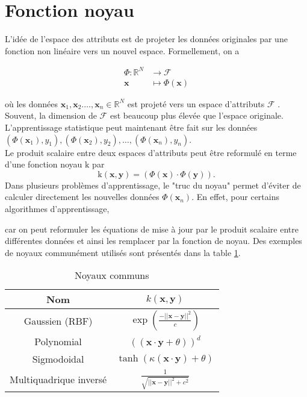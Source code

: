 \section{Fonction noyau}

L'idée de l'espace des attributs est de projeter les données originales par une fonction non linéaire vers un nouvel espace. Formellement, on a 

\begin{align*}
\Phi : \mathbb{R}^N &\to \mathcal{F} \\
\textbf{x} &\mapsto \Phi(\textbf{x})
\end{align*}

où les données $\textbf{x}_1, \textbf{x}_2. \dots, \textbf{x}_n \in \mathbb{R}^N$ est projeté vers un espace d'attributs $\mathcal{F}$ \cite{muller2001introduction}. Souvent, la dimension de $\mathcal{F}$ est beaucoup plus élevée que l'espace originale. L'apprentissage statistique peut maintenant être fait sur les données $(\Phi(\textbf{x}_1), y_1), (\Phi(\textbf{x}_2), y_2), \dots, (\Phi(\textbf{x}_n), y_n)$. \\

Le produit scalaire entre deux espaces d'attributs peut être reformulé en terme d'une fonction noyau $\textrm{k}$ par
$$\textrm{k}(\textbf{x}, \textbf{y}) = (\Phi(\textbf{x})\cdot \Phi(\textbf{y})).$$
Dans plusieurs problèmes d'apprentissage, le "truc du noyau" permet d'éviter de calculer directement les nouvelles données $\Phi(\textbf{x}_n)$. En effet, pour certains algorithmes d'apprentissage, 


car on peut reformuler les équations de mise à jour par le produit scalaire entre différentes données et ainsi les remplacer par la fonction de noyau. Des exemples de noyaux communément utilisés sont présentés dans la table \ref{tab:kernels}.

\begin{table}[H]
	\centering
\begin{tabular}{|c|c|}
	\hline
	         Nom           &                  $k(\textbf{x}, \textbf{y})$                  \\ \hline
	    Gaussien (RBF)     & $\exp \left(\frac{-|| \textbf{x} - \textbf{y}||^2}{c}\right)$ \\ \hline
	      Polynomial       &         $((\textbf{x} \cdot \textbf{y} + \theta))^d$          \\ \hline
	     Sigmodoidal       &    $\tanh (\kappa (\textbf{x} \cdot \textbf{y}) + \theta)$    \\ \hline
	Multiquadrique inversé &     $\frac{1}{\sqrt{||\textbf{x}-\textbf{y}||^2 + c^2}}$      \\ \hline
\end{tabular} 
\caption{Noyaux communs}
\label{tab:kernels}
\end{table}
